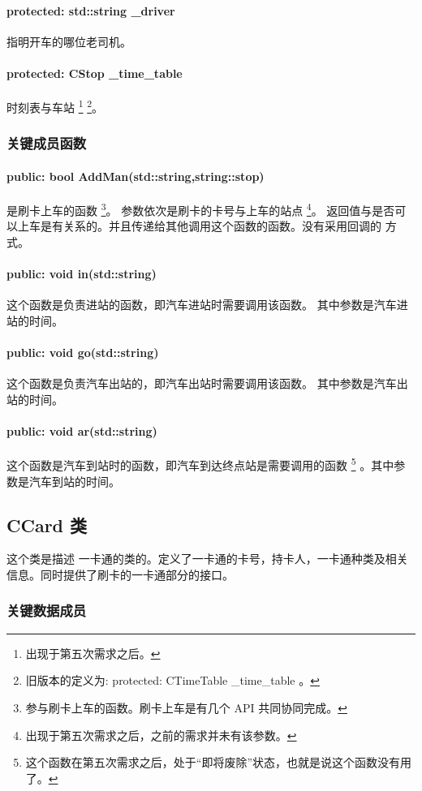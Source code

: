 \documentclass{ctexart}
\begin{document}
    \paragraph{protected: std::string \_driver} 指明开车的哪位老司机。
    \paragraph{protected: CStop \_time\_table} 时刻表与车站
    \footnote{出现于第五次需求之后。}
    \footnote{旧版本的定义为: protected: CTimeTable \_time\_table 。}。
    \subsubsection{关键成员函数}
    \paragraph{public: bool AddMan(std::string,string::stop)}
    是刷卡上车的函数
    \footnote{参与刷卡上车的函数。刷卡上车是有几个 API 共同协同完成。}。
    参数依次是刷卡的卡号与上车的站点
    \footnote{出现于第五次需求之后，之前的需求并未有该参数。}。
    返回值与是否可以上车是有关系的。并且传递给其他调用这个函数的函数。没有采用回调的
    方式。
    \paragraph{public: void in(std::string)}
    这个函数是负责进站的函数，即汽车进站时需要调用该函数。
    其中参数是汽车进站的时间。
    \paragraph{public: void go(std::string)}
    这个函数是负责汽车出站的，即汽车出站时需要调用该函数。
    其中参数是汽车出站的时间。
    \paragraph{public: void ar(std::string)}
    这个函数是汽车到站时的函数，即汽车到达终点站是需要调用的函数
    \footnote{这个函数在第五次需求之后，处于“即将废除”状态，也就是说这个函数没有用了。}
    。其中参数是汽车到站的时间。
    \subsection{CCard 类}
    这个类是描述 一卡通的类的。定义了一卡通的卡号，持卡人，一卡通种类及相关信息。同时提供了刷卡的一卡通部分的接口。
    \subsubsection{关键数据成员}
\end{document}
